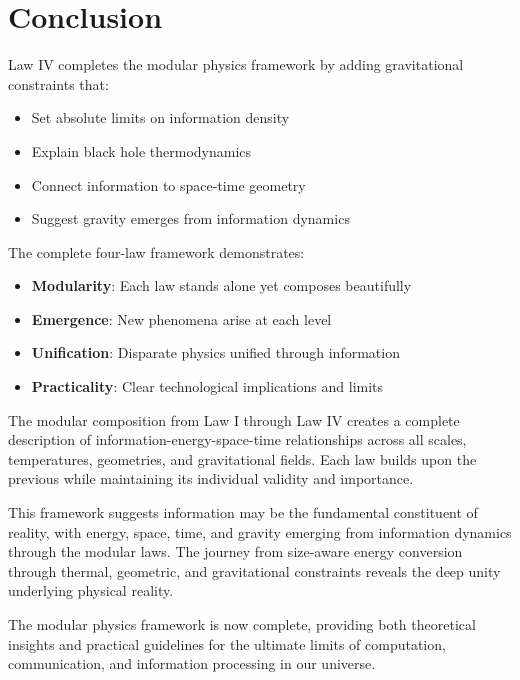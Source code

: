 \documentclass[11pt,a4paper]{article}
\theoremstyle{definition}
\begin{document}
\section{Conclusion}

Law IV completes the modular physics framework by adding gravitational constraints that:

\begin{itemize}
\item Set absolute limits on information density
\item Explain black hole thermodynamics
\item Connect information to space-time geometry
\item Suggest gravity emerges from information dynamics
\end{itemize}

The complete four-law framework demonstrates:

\begin{itemize}
\item \textbf{Modularity}: Each law stands alone yet composes beautifully
\item \textbf{Emergence}: New phenomena arise at each level
\item \textbf{Unification}: Disparate physics unified through information
\item \textbf{Practicality}: Clear technological implications and limits
\end{itemize}

The modular composition from Law I through Law IV creates a complete description of information-energy-space-time relationships across all scales, temperatures, geometries, and gravitational fields. Each law builds upon the previous while maintaining its individual validity and importance.

This framework suggests information may be the fundamental constituent of reality, with energy, space, time, and gravity emerging from information dynamics through the modular laws. The journey from size-aware energy conversion through thermal, geometric, and gravitational constraints reveals the deep unity underlying physical reality.

The modular physics framework is now complete, providing both theoretical insights and practical guidelines for the ultimate limits of computation, communication, and information processing in our universe.
\end{document}
